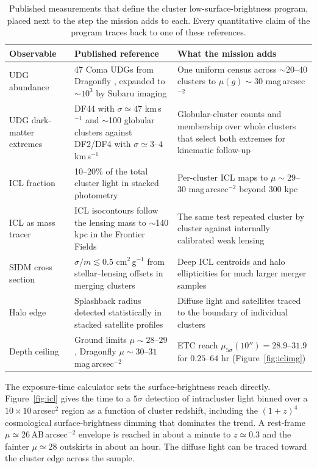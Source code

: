 \begin{table}[htbp]
\centering
\sffamily\small
\begin{tabularx}{\textwidth}{@{}p{2.6cm}p{5.6cm}X@{}}
\toprule
\textbf{Observable} & \textbf{Published reference} & \textbf{What the mission adds}\\
\midrule
UDG abundance & 47 Coma UDGs from Dragonfly \cite{vandokkum2015coma}, expanded to $\sim\!10^3$ by Subaru imaging \cite{koda2015,yagi2016} & One uniform census across $\sim$20--40 clusters to $\mu(g)\sim30$ mag\,arcsec$^{-2}$\\
UDG dark-matter extremes & DF44 with $\sigma\simeq47$ km\,s$^{-1}$ and $\sim$100 globular clusters \cite{vandokkum2016df44} against DF2/DF4 with $\sigma\simeq3$--$4$ km\,s$^{-1}$ \cite{vandokkum2018df2,vandokkum2019df4} & Globular-cluster counts and membership over whole clusters that select both extremes for kinematic follow-up\\
ICL fraction & 10--20\% of the total cluster light in stacked photometry \cite{zibetti2005} & Per-cluster ICL maps to $\mu\sim29$--$30$ mag\,arcsec$^{-2}$ beyond $300$ kpc\\
ICL as mass tracer & ICL isocontours follow the lensing mass to $\sim$140 kpc in the Frontier Fields \cite{montes2019icl} & The same test repeated cluster by cluster against internally calibrated weak lensing\\
SIDM cross section & $\sigma/m\lesssim0.5$ cm$^2$\,g$^{-1}$ from stellar--lensing offsets in merging clusters \cite{harvey2015} & Deep ICL centroids and halo ellipticities for much larger merger samples\\
Halo edge & Splashback radius detected statistically in stacked satellite profiles \cite{more2016} & Diffuse light and satellites traced to the boundary of individual clusters\\
Depth ceiling & Ground limits $\mu\sim28$--$29$, Dragonfly $\mu\sim30$--$31$ mag\,arcsec$^{-2}$ \cite{abraham2014dragonfly} & ETC reach $\mu_{5\sigma}(10'')=28.9$--$31.9$ for $0.25$--$64$ hr (Figure~\ref{fig:iclimg})\\
\bottomrule
\end{tabularx}
\caption{Published measurements that define the cluster low-surface-brightness program, placed next to the step the mission adds to each. Every quantitative claim of the program traces back to one of these references.}
\label{tab:lsbanchors}
\end{table}

The exposure-time calculator sets the surface-brightness reach directly. Figure~\ref{fig:icl} gives the time to a $5\sigma$ detection of intracluster light binned over a $10\times10$\,arcsec$^2$ region as a function of cluster redshift, including the $(1+z)^4$ cosmological surface-brightness dimming that dominates the trend. A rest-frame $\mu\simeq26$\,AB\,arcsec$^{-2}$ envelope is reached in about a minute to $z\simeq0.3$ and the fainter $\mu\simeq28$ outskirts in about an hour. The diffuse light can be traced toward the cluster edge across the sample.


